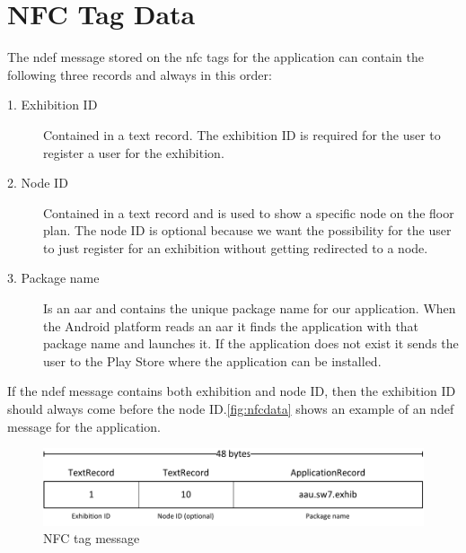 \section{NFC Tag Data}
\label{sec:nfcdata}

The \ac{ndef} message stored on the \ac{nfc} tags for the application can contain the following three records and always in this order:

\begin{description}
\item[1. Exhibition ID] Contained in a text record. The exhibition ID is required for the user to register a user for the exhibition.
\item[2. Node ID] Contained in a text record and is used to show a specific node on the floor plan. The node ID is optional because we want the possibility for the user to just register for an exhibition without getting redirected to a node.
\item[3. Package name] Is an \ac{aar} and contains the unique package name for our application. When the Android platform reads an \ac{aar} it finds the application with that package name and launches it. If the application does not exist it sends the user to the Play Store where the application can be installed.
\end{description}
If the \ac{ndef} message contains both exhibition and node ID, then the exhibition ID should always come before the node ID.\autoref{fig:nfcdata} shows an example of an \ac{ndef} message for the application.

\begin{figure}[H]
\centering
\includegraphics[width=0.97\columnwidth]{img/nfctag.pdf}
\caption{NFC tag message}
\label{fig:nfcdata}
\end{figure}

